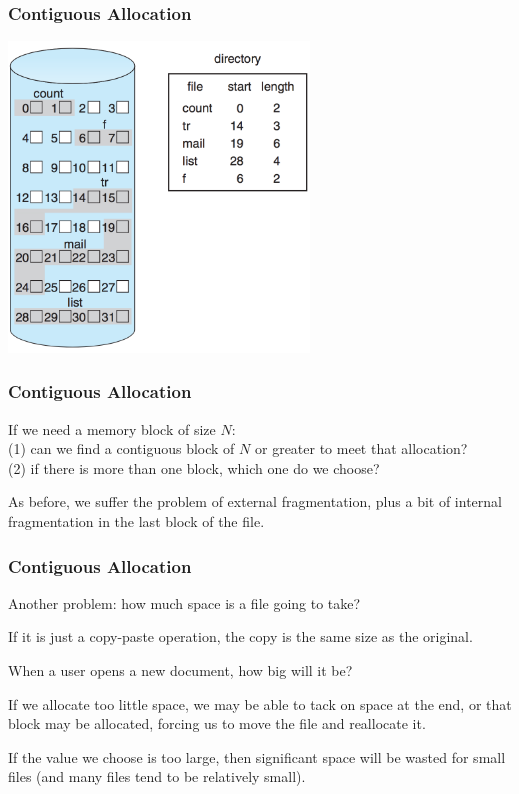 \begin{frame}
	\frametitle{Contiguous Allocation}

	\begin{center}
		\includegraphics[width=0.6\textwidth]{images/disk-contiguous.png}
	\end{center}

\end{frame}

\begin{frame}
	\frametitle{Contiguous Allocation}


	If we need a memory block of size $N$:\\
	\quad (1) can we find a contiguous block of $N$ or greater to meet that allocation?\\
	\quad (2) if there is more than one block, which one do we choose?

	As before, we suffer the problem of external fragmentation, plus a bit of internal fragmentation in the last block of the file.

\end{frame}

\begin{frame}
	\frametitle{Contiguous Allocation}

	Another problem: how much space is a file going to take?

	If it is just a copy-paste operation, the copy is the same size as the original.

	When a user opens a new document, how big will it be?

	If we allocate too little space, we may be able to tack on space at the end, or that block may be allocated, forcing us to move the file and reallocate it.

	If the value we choose is too large, then significant space will be wasted for small files (and many files tend to be relatively small).

\end{frame}

